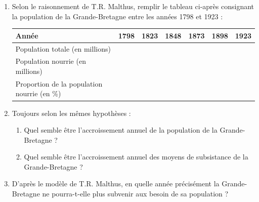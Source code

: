 \documentclass[oneside,12pt]{article}          %
\begin{document}
\begin{tcolorbox}[
    enhanced , arc = 3pt , top = 4mm ,
    fonttitle = \bfseries , title = Questions sur le document \no 2  , boxed title style = {arc = 3pt} ,
    coltitle = black , colbacktitle = white ,
    attach boxed title to top left = {xshift = 5mm , yshift = -4mm} ,
	]

	\begin{enumerate}
		\item Selon le raisonnement de T.R. Malthus, remplir le tableau ci-après consignant la population de la Grande-Bretagne entre les années 1798 et 1923 :
		
		\begin{center}
		\renewcommand{\arraystretch}{2}
			\begin{tabular}{| P{3cm} | P{1.75cm} | P{1.75cm} | P{1.75cm}| P{1.75cm} | P{1.75cm} | P{1.75cm} |}
			    \hline
			    \textbf{Année} & 1798 & 1823 & 1848 & 1873 & 1898 & 1923 \\
			    \hline
			    Population totale (en millions) & & & & & & \\
			    \hline
			    Population nourrie (en millions) & & & & & & \\
			    \hline
			    Proportion de la population nourrie (en \%) & & & & & & \\
			    \hline
			\end{tabular}
		\end{center}
		
		\item Toujours selon les mêmes hypothèses :
		\begin{enumerate}
			\item Quel semble être l'accroissement annuel de la population de la Grande-Bretagne ?
			\item Quel semble être l'accroissement annuel des moyens de subsistance de la Grande-Bretagne ?
		\end{enumerate}

		\item D'après le modèle de T.R. Malthus, en quelle année précisément la Grande-Bretagne ne pourra-t-elle plus subvenir aux besoin de sa population ?
	\end{enumerate}
\end{tcolorbox}



\vfill
{}
\end{document}
